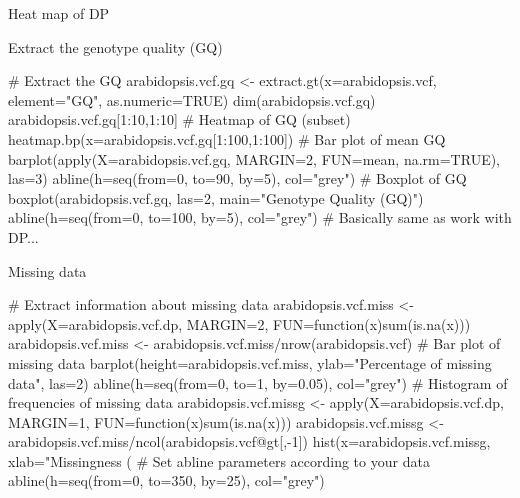 \documentclass[compress, xelatex, 11pt, xcolor=svgnames, aspectratio=169,
	hyperref={
		bookmarks=true,
		unicode=true,
		colorlinks=true,
		pdftitle={Molecular data in R},
		plainpages=false,
		pdfauthor={Vojtech Zeisek},
		pdfsubject={Course about phylogeny and evolution in R},
		pdfcreator={XeLaTeX},
		pdfkeywords={R, evolution, phylogeny, molecular data},
		linkcolor=Crimson, %
		anchorcolor=Magenta, %
		citecolor=Magenta, %
		filecolor=Magenta, %
		menucolor=Magenta, %
		urlcolor=DodgerBlue, %
		},
	url={hyphens, lowtilde} %
	]{beamer}
\renewcommand{\texttt}[1]{\colorbox{Beige}{{\ttfamily #1}}}
\begin{document}
\begin{frame}{Heat map of DP}
	\begin{center}
		\texttt{[image: vcf\_dp\_heatmap.png]}
	\end{center}
\end{frame}

\begin{frame}[fragile]{Extract the genotype quality (GQ)}
	\begin{spluscode}
    # Extract the GQ
    arabidopsis.vcf.gq <- extract.gt(x=arabidopsis.vcf, element="GQ",
      as.numeric=TRUE)
    dim(arabidopsis.vcf.gq)
    arabidopsis.vcf.gq[1:10,1:10]
    # Heatmap of GQ (subset)
    heatmap.bp(x=arabidopsis.vcf.gq[1:100,1:100])
    # Bar plot of mean GQ
    barplot(apply(X=arabidopsis.vcf.gq, MARGIN=2, FUN=mean, na.rm=TRUE),
      las=3)
    abline(h=seq(from=0, to=90, by=5), col="grey")
    # Boxplot of GQ
    boxplot(arabidopsis.vcf.gq, las=2, main="Genotype Quality (GQ)")
    abline(h=seq(from=0, to=100, by=5), col="grey")
    # Basically same as work with DP...
	\end{spluscode}
\end{frame}

\begin{frame}[fragile]{Missing data}
	\begin{spluscode}
    # Extract information about missing data
    arabidopsis.vcf.miss <- apply(X=arabidopsis.vcf.dp, MARGIN=2,
      FUN=function(x){sum(is.na(x))})
    arabidopsis.vcf.miss <- arabidopsis.vcf.miss/nrow(arabidopsis.vcf)
    # Bar plot of missing data
    barplot(height=arabidopsis.vcf.miss, ylab="Percentage of missing data",
      las=2)
    abline(h=seq(from=0, to=1, by=0.05), col="grey")
    # Histogram of frequencies of missing data
    arabidopsis.vcf.missg <- apply(X=arabidopsis.vcf.dp, MARGIN=1,
      FUN=function(x){sum(is.na(x))})
    arabidopsis.vcf.missg <-
      arabidopsis.vcf.miss/ncol(arabidopsis.vcf@gt[,-1])
    hist(x=arabidopsis.vcf.missg, xlab="Missingness (%
    # Set abline parameters according to your data
    abline(h=seq(from=0, to=350, by=25), col="grey")
	\end{spluscode}
\end{frame}
\end{document}
